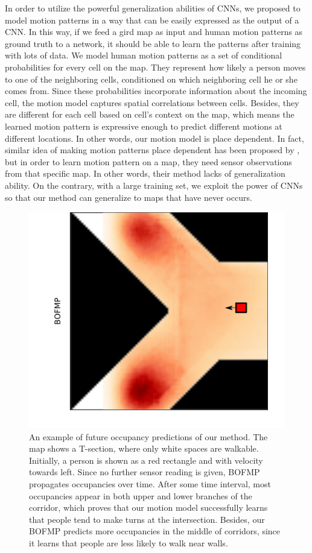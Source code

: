 In order to utilize the powerful generalization abilities of CNNs, we proposed to model motion patterns in a way that can be easily expressed as the output of a CNN. In this way, if we feed a gird map as input and human motion patterns as ground truth to a network, it should be able to learn the patterns after training with lots of data. We model human motion patterns as a set of conditional probabilities for every cell on the map. They represent how likely a person moves to one of the neighboring cells, conditioned on which neighboring cell he or she comes from. Since these probabilities incorporate information about the incoming cell, the motion model captures spatial correlations between cells. Besides, they are different for each cell based on cell's context on the map, which means the learned motion pattern is expressive enough to predict different motions at different locations. In other words, our motion model is place dependent. In fact, similar idea of making motion patterns place dependent has been proposed by \cite{kucner2013conditional}, but in order to learn motion pattern on a map, they need sensor observations from that specific map. In other words, their method lacks of generalization ability. On the contrary, with a large training set, we exploit the power of CNNs so that our method can generalize to maps that have never occurs.

\begin{figure}[H]
  \centering
    \includegraphics[width=.6\textwidth]{figures/theme_plot_1.png}
    \caption[An example of future occupancy predictions of our method.]{An example of future occupancy predictions of our method.  The map shows a T-section, where only white spaces are walkable. Initially, a person is shown as a red rectangle and with velocity towards left. Since no further sensor reading is given, BOFMP propagates occupancies over time. After some time interval, most occupancies appear in both upper and lower branches of the corridor, which proves that our motion model successfully learns that people tend to make turns at the intersection. Besides, our BOFMP predicts more occupancies in the middle of corridors, since it learns that people are less likely to walk near walls.}
    \label{fig:idea}
\end{figure}

